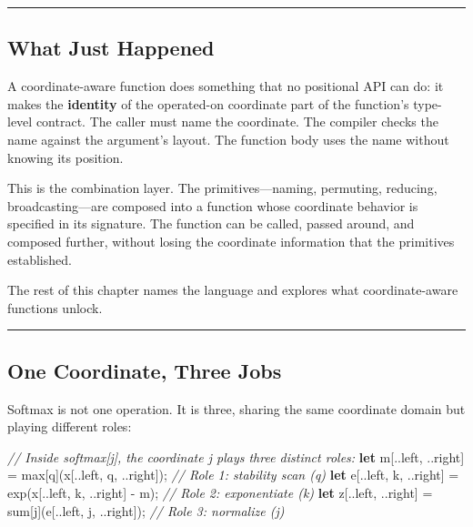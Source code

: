 \documentclass[11pt,]{article}
\newenvironment{Shaded}{}{}
\newcommand{\CommentTok}[1]{\textcolor[rgb]{0.38,0.63,0.69}{\textit{#1}}}
\newcommand{\KeywordTok}[1]{\textcolor[rgb]{0.00,0.44,0.13}{\textbf{#1}}}
\newcommand{\NormalTok}[1]{#1}
\newcommand{\OperatorTok}[1]{\textcolor[rgb]{0.40,0.40,0.40}{#1}}
\begin{document}
\begin{center}\rule{0.5\linewidth}{0.4pt}\end{center}

\hypertarget{what-just-happened}{%
\subsection{What Just Happened}\label{what-just-happened}}

A coordinate-aware function does something that no positional API can
do: it makes the \textbf{identity} of the operated-on coordinate part of
the function's type-level contract. The caller must name the coordinate.
The compiler checks the name against the argument's layout. The function
body uses the name without knowing its position.

This is the combination layer. The primitives---naming, permuting,
reducing, broadcasting---are composed into a function whose coordinate
behavior is specified in its signature. The function can be called,
passed around, and composed further, without losing the coordinate
information that the primitives established.

The rest of this chapter names the language and explores what
coordinate-aware functions unlock.

\begin{center}\rule{0.5\linewidth}{0.4pt}\end{center}

\hypertarget{one-coordinate-three-jobs}{%
\subsection{One Coordinate, Three
Jobs}\label{one-coordinate-three-jobs}}

Softmax is not one operation. It is three, sharing the same coordinate
domain but playing different roles:

\begin{Shaded}
\begin{Highlighting}[]
\CommentTok{// Inside softmax[j], the coordinate j plays three distinct roles:}
\KeywordTok{let}\NormalTok{ m}\OperatorTok{[}\NormalTok{..left, ..right}\OperatorTok{]}\NormalTok{ = max}\OperatorTok{[}\NormalTok{q}\OperatorTok{]}\NormalTok{(x}\OperatorTok{[}\NormalTok{..left, q, ..right}\OperatorTok{]}\NormalTok{);    }\CommentTok{// Role 1: stability scan (q)}
\KeywordTok{let}\NormalTok{ e}\OperatorTok{[}\NormalTok{..left, k, ..right}\OperatorTok{]}\NormalTok{ = exp(x}\OperatorTok{[}\NormalTok{..left, k, ..right}\OperatorTok{]}\NormalTok{ - m); }\CommentTok{// Role 2: exponentiate (k)}
\KeywordTok{let}\NormalTok{ z}\OperatorTok{[}\NormalTok{..left, ..right}\OperatorTok{]}\NormalTok{ = sum}\OperatorTok{[}\NormalTok{j}\OperatorTok{]}\NormalTok{(e}\OperatorTok{[}\NormalTok{..left, j, ..right}\OperatorTok{]}\NormalTok{);     }\CommentTok{// Role 3: normalize (j)}
\end{Highlighting}
\end{Shaded}
\end{document}
